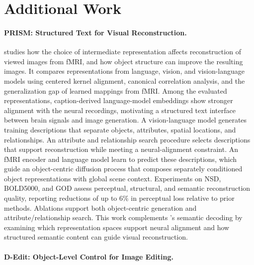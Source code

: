 \FloatBarrier
\section{Additional Work}
\label{sec:mindllm-additional-work}

\paragraph*{PRISM: Structured Text for Visual Reconstruction.}

\prism{} studies how the choice of intermediate representation affects reconstruction of viewed images from fMRI, and how object structure can improve the resulting images. It compares representations from language, vision, and vision-language models using centered kernel alignment, canonical correlation analysis, and the generalization gap of learned mappings from fMRI. Among the evaluated representations, caption-derived language-model embeddings show stronger alignment with the neural recordings, motivating a structured text interface between brain signals and image generation. A vision-language model generates training descriptions that separate objects, attributes, spatial locations, and relationships. An attribute and relationship search procedure selects descriptions that support reconstruction while meeting a neural-alignment constraint. An fMRI encoder and language model learn to predict these descriptions, which guide an object-centric diffusion process that composes separately conditioned object representations with global scene context. Experiments on NSD, BOLD5000, and GOD assess perceptual, structural, and semantic reconstruction quality, reporting reductions of up to 6\% in perceptual loss relative to prior methods. Ablations support both object-centric generation and attribute/relationship search. This work complements \mindllm{}'s semantic decoding by examining which representation spaces support neural alignment and how structured semantic content can guide visual reconstruction.

\paragraph*{D-Edit: Object-Level Control for Image Editing.}

